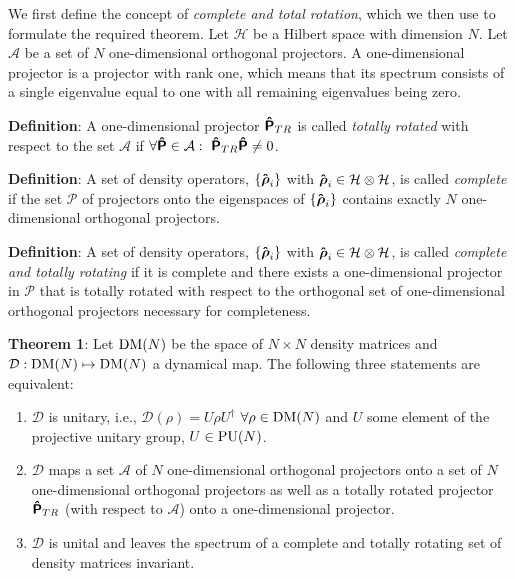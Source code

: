 We first define the concept of \emph{complete and total
rotation}, which we then use to formulate the required theorem.
Let $\mathcal{H}$ be a Hilbert space with dimension $N$. Let
$\mathcal{A}$ be a set of
$N$ one-dimensional orthogonal projectors. A one-dimensional projector
is a projector with rank one, which means that its spectrum consists of a
single eigenvalue equal to one with all remaining eigenvalues being zero.

\textbf{Definition}:
A one-dimensional projector $\boldsymbol{\mathsf{\hat{P}}}_{TR}$ is called \emph{totally rotated} with
respect to the set $\mathcal{A}$ if $\forall \Op P\in\mathcal{A}:\ 
\Op P_{TR}\Op P\neq0$.

\textbf{Definition}:
A set of density operators, $\left\{ \boldsymbol{\mathsf{\hat{\rho}}}_{i}\right\}$ with
$\boldsymbol{\mathsf{\hat{\rho}}}_{i}\in\mathcal{H}\otimes\mathcal{H}$, is called \emph{complete} if
the set $\mathcal{P}$ of projectors onto the eigenspaces of
$\left\{ \boldsymbol{\mathsf{\hat{\rho}}}_{i}\right\}$ contains exactly
$N$ one-dimensional orthogonal projectors.

\textbf{Definition}:
A set of density operators, $\left\{ \boldsymbol{\mathsf{\hat{\rho}}}_{i}\right\}$ with
$\boldsymbol{\mathsf{\hat{\rho}}}_{i}\in\mathcal{H}\otimes\mathcal{H}$, is called \emph{complete and
totally rotating} if it is complete and there exists a
one-dimensional projector in $\mathcal{P}$ that is totally rotated
with respect to the orthogonal set of one-dimensional orthogonal
projectors necessary for completeness.


\textbf{Theorem 1}:
Let $\text{DM\ensuremath{\left(N\right)}}$ be the space of $N\times N$
density matrices and $\mathcal{D}:\text{DM\ensuremath{\left(N\right)}}
\mapsto\text{DM\ensuremath{\left(N\right)}}$ a
dynamical map. The following three statements are equivalent:
\begin{enumerate}
\item $\mathcal{D}$ is unitary, i.e.,
  $\mathcal{D}\left(\rho\right)=U\rho U^{\dagger}$
  $\forall\rho\in\text{DM\ensuremath{\left(N\right)}}$
  and $U$ some element of the projective unitary group,
  $U\in\text{PU\ensuremath{\left(N\right)}}$.
\item $\mathcal{D}$ maps a set $\mathcal{A}$ of $N$ one-dimensional
  orthogonal projectors onto a set of $N$ one-dimensional orthogonal
  projectors as well as a totally rotated projector $\boldsymbol{\mathsf{\hat{P}}}_{TR}$
  (with respect to $\mathcal{A}$) onto a one-dimensional projector.
\item $\mathcal{D}$ is unital and leaves the spectrum of a complete
  and totally rotating set of density matrices invariant.
\end{enumerate}

